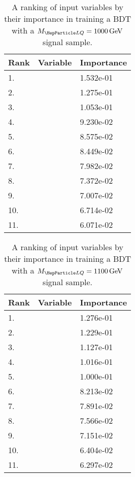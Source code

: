 \begin{table}[H]
	\caption{A ranking of input variables by their importance in training a BDT with a $\MLQ = \SI{1000}{GeV}$ signal sample.}
	\begin{center}
		\begin{tabular}{lll} \hline \hline
			Rank & Variable & Importance  \\ \hline
			1. & \ST & 1.532e-01 \\
			2. & \MujTwo & 1.275e-01 \\
			3. & \MujOne & 1.053e-01 \\
			4. & \Muujj & 9.230e-02 \\
			5. & \ptof{\PmuTwo} & 8.575e-02 \\
			6. & \ptof{\PmuOne} & 8.449e-02 \\
			7. & \ptof{\PjOne} & 7.982e-02 \\
			8. & \ptof{\PjTwo} & 7.372e-02 \\
			9. & \MET & 7.007e-02 \\
			10. & \Muu & 6.714e-02 \\
			11. & \DRof{\PmuOne+\PmuTwo}{\PjOne} & 6.071e-02 \\ \hline \hline
		\end{tabular}
		\label{tab:bdtRank1000}
	\end{center}
\end{table}

\begin{table}[H]
	\caption{A ranking of input variables by their importance in training a BDT with a $\MLQ = \SI{1100}{GeV}$ signal sample.}
	\begin{center}
		\begin{tabular}{lll} \hline \hline
			Rank & Variable & Importance  \\ \hline
			1. & \MujTwo & 1.276e-01 \\
			2. & \ST & 1.229e-01 \\
			3. & \MET & 1.127e-01 \\
			4. & \MujOne & 1.016e-01 \\
			5. & \Muujj & 1.000e-01 \\
			6. & \ptof{\PmuOne} & 8.213e-02 \\
			7. & \ptof{\PmuTwo} & 7.891e-02 \\
			8. & \ptof{\PjOne} & 7.566e-02 \\
			9. & \ptof{\PjTwo} & 7.151e-02 \\
			10. & \DRof{\PmuOne+\PmuTwo}{\PjOne} & 6.404e-02 \\
			11. & \Muu & 6.297e-02 \\ \hline \hline
		\end{tabular}
		\label{tab:bdtRank1100}
	\end{center}
\end{table}

